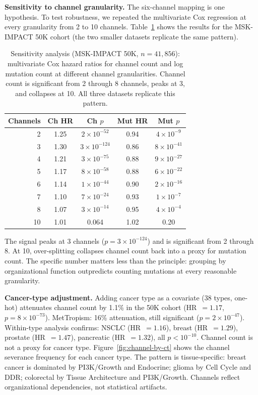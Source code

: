 \documentclass[11pt]{article}
\begin{document}
\textbf{Sensitivity to channel granularity.} The six-channel mapping
is one hypothesis. To test robustness, we repeated the multivariate
Cox regression at every granularity from 2 to 10 channels.
Table~\ref{tab:sensitivity} shows the results for the MSK-IMPACT
50K cohort (the two smaller datasets replicate the same pattern).

\begin{table}[ht]
\centering
\caption{Sensitivity analysis (MSK-IMPACT 50K, $n = 41{,}856$):
multivariate Cox hazard ratios for channel count and log mutation
count at different channel granularities. Channel count is
significant from 2 through 8 channels, peaks at 3, and collapses
at 10. All three datasets replicate this pattern.}
\label{tab:sensitivity}
\medskip
\begin{tabular*}{\textwidth}{@{\extracolsep{\fill}}rcccc@{}}
\toprule
Channels & Ch HR & Ch $p$ & Mut HR & Mut $p$ \\
\midrule
2 & 1.25 & $2 \times 10^{-52}$ & 0.94 & $4 \times 10^{-9}$ \\
3 & 1.30 & $3 \times 10^{-124}$ & 0.86 & $8 \times 10^{-41}$ \\
4 & 1.21 & $3 \times 10^{-75}$ & 0.88 & $9 \times 10^{-27}$ \\
5 & 1.17 & $8 \times 10^{-58}$ & 0.88 & $6 \times 10^{-22}$ \\
6 & 1.14 & $1 \times 10^{-44}$ & 0.90 & $2 \times 10^{-16}$ \\
7 & 1.10 & $7 \times 10^{-24}$ & 0.93 & $1 \times 10^{-7}$ \\
8 & 1.07 & $3 \times 10^{-14}$ & 0.95 & $4 \times 10^{-4}$ \\
10 & 1.01 & 0.064 & 1.02 & 0.20 \\
\bottomrule
\end{tabular*}
\end{table}

The signal peaks at 3 channels ($p = 3 \times 10^{-124}$) and is
significant from 2 through 8. At 10, over-splitting collapses
channel count back into a proxy for mutation count. The specific
number matters less than the principle: grouping by organizational
function outpredicts counting mutations at every reasonable
granularity.

\textbf{Cancer-type adjustment.} Adding cancer type as a covariate
(38 types, one-hot) attenuates channel count by 1.1\% in the 50K
cohort (HR~$= 1.17$, $p = 8 \times 10^{-73}$). MetTropism: 16\%
attenuation, still significant ($p = 2 \times 10^{-47}$).
Within-type analysis confirms: NSCLC (HR~$= 1.16$),
breast (HR~$= 1.29$), prostate (HR~$= 1.47$),
pancreatic (HR~$= 1.32$), all $p < 10^{-10}$.
Channel count is not a proxy for cancer type.
Figure~\ref{fig:channel-by-ct} shows the channel severance
frequency for each cancer type. The pattern is tissue-specific:
breast cancer is dominated by PI3K/Growth and Endocrine; glioma by
Cell Cycle and DDR; colorectal by Tissue Architecture and
PI3K/Growth. Channels reflect organizational dependencies, not
statistical artifacts.
\end{document}

